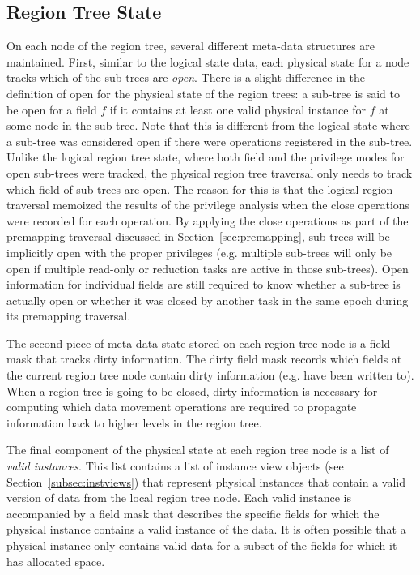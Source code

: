 \subsection{Region Tree State}
\label{subsec:physstate}
On each node of the region tree, several different
meta-data structures are maintained. First, similar to
the logical state data, each physical state for a
node tracks which of the sub-trees are {\em open}.
There is a slight difference in the definition of open
for the physical state of the region trees: a sub-tree
is said to be open for a field $f$ if it contains at
least one valid physical instance for $f$ at some
node in the sub-tree. Note that this is different
from the logical state where a sub-tree was considered 
open if there were operations registered in the sub-tree.
Unlike the logical region tree state, where both
field and the privilege modes for open sub-trees
were tracked, the physical region tree traversal
only needs to track which field of sub-trees are
open.  The reason for this is that the logical 
region traversal memoized the results of the privilege
analysis when the close operations were recorded
for each operation.  By applying the close operations
as part of the premapping traversal discussed in 
Section~\ref{sec:premapping}, sub-trees will be
implicitly open with the proper privileges (e.g.
multiple sub-trees will only be open if multiple
read-only or reduction tasks are active in those
sub-trees). Open information for individual fields
are still required to know whether a sub-tree is
actually open or whether it was closed by another
task in the same epoch during its premapping
traversal.

The second piece of meta-data state stored on each 
region tree node is a field mask that tracks dirty
information. The dirty field mask records which
fields at the current region tree node contain
dirty information (e.g. have been written to).
When a region tree is going to be closed, dirty
information is necessary for computing which
data movement operations are required to propagate 
information back to higher levels in the region tree.

The final component of the physical state at
each region tree node is a list of {\em valid
instances}.  This list contains a list of 
instance view objects (see 
Section~\ref{subsec:instviews}) that represent
physical instances that contain a valid version
of data from the local region tree node. Each
valid instance is accompanied by a field mask
that describes the specific fields for which
the physical instance contains a valid instance
of the data.  It is often possible that a
physical instance only contains valid data for
a subset of the fields for which it has 
allocated space.


